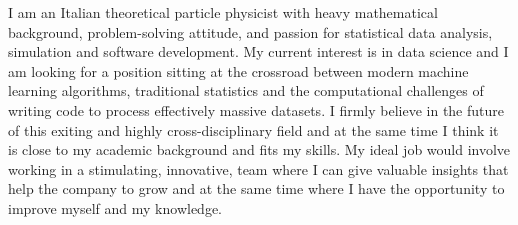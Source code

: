I am an Italian theoretical particle physicist with heavy mathematical
background, problem-solving attitude, and passion for statistical data
analysis, simulation and software development.
My current interest is in data science and I am looking for a position sitting at the crossroad
between 
modern machine learning algorithms, traditional statistics and the computational
challenges of writing code to process effectively massive datasets. 
I firmly believe in the future of this exiting and highly cross-disciplinary field and at the same time I think it is
close to my academic background  and fits my skills. 
My ideal job would involve working in a stimulating, innovative,
team where I can give
valuable insights that help the 
company to grow  and at the same time where I have the opportunity  to
improve myself and my knowledge.
